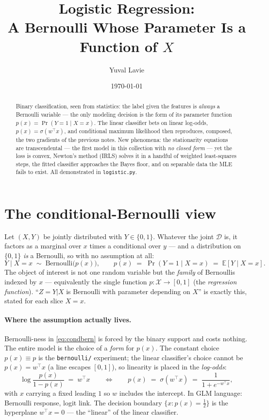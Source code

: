 \documentclass[11pt]{article}
\title{Logistic Regression:\\
A Bernoulli Whose Parameter Is a Function of $X$}
\author{Yuval Lavie}
\date{\today}
\newcommand{\sig}{\sigma}
\newcommand{\D}{\mathcal{D}}
\begin{document}
\maketitle

\begin{abstract}
Binary classification, seen from statistics: the label given the features
is \emph{always} a Bernoulli variable --- the only modeling decision is
the form of its parameter function $p(x) = \Pr(Y{=}1 \mid X{=}x)$. The
linear classifier bets on linear log-odds, $p(x) = \sig(w^\top x)$, and
conditional maximum likelihood then reproduces, composed, the two
gradients of the previous notes. New phenomena: the stationarity
equations are transcendental --- the first model in this collection with
\emph{no closed form} --- yet the loss is convex, Newton's method (IRLS)
solves it in a handful of weighted least-squares steps, the fitted
classifier approaches the Bayes floor, and on separable data the MLE
fails to exist. All demonstrated in \texttt{logistic.py}.
\end{abstract}

\section{The conditional-Bernoulli view}

Let $(X, Y)$ be jointly distributed with $Y \in \{0,1\}$. Whatever the
joint $\D$ is, it factors as a marginal over $x$ times a conditional over
$y$ --- and a distribution on $\{0,1\}$ \emph{is} a Bernoulli, so with no
assumption at all:
\begin{equation}
  Y \mid X = x \;\sim\; \mathrm{Bernoulli}\bigl(p(x)\bigr),
  \qquad
  p(x) \;=\; \Pr(Y=1 \mid X=x) \;=\; \mathbb{E}[Y \mid X=x].
  \label{eq:condbern}
\end{equation}
The object of interest is not one random variable but the \emph{family}
of Bernoullis indexed by $x$ --- equivalently the single function
$p:\mathcal{X}\to[0,1]$ (the \emph{regression function}). ``$Z = Y|X$ is
Bernoulli with parameter depending on $X$'' is exactly this, stated for
each slice $X = x$.

\paragraph{Where the assumption actually lives.}
Bernoulli-ness in \eqref{eq:condbern} is forced by the binary support and
costs nothing. The entire model is the choice of a \emph{form} for
$p(x)$. The constant choice $p(x)\equiv p$ is the \texttt{bernoulli/}
experiment; the linear classifier's choice cannot be
$p(x) = w^\top x$ (a line escapes $[0,1]$), so linearity is placed in the
\emph{log-odds}:
\begin{equation}
  \log\frac{p(x)}{1-p(x)} \;=\; w^\top x
  \qquad\Longleftrightarrow\qquad
  p(x) \;=\; \sig(w^\top x) \;=\; \frac{1}{1+e^{-w^\top x}},
  \label{eq:logit}
\end{equation}
with $x$ carrying a fixed leading $1$ so $w$ includes the intercept. In
GLM language: Bernoulli response, logit link. The decision boundary
$\{x : p(x) = \tfrac12\}$ is the hyperplane $w^\top x = 0$ --- the
``linear'' of the linear classifier.
\end{document}
